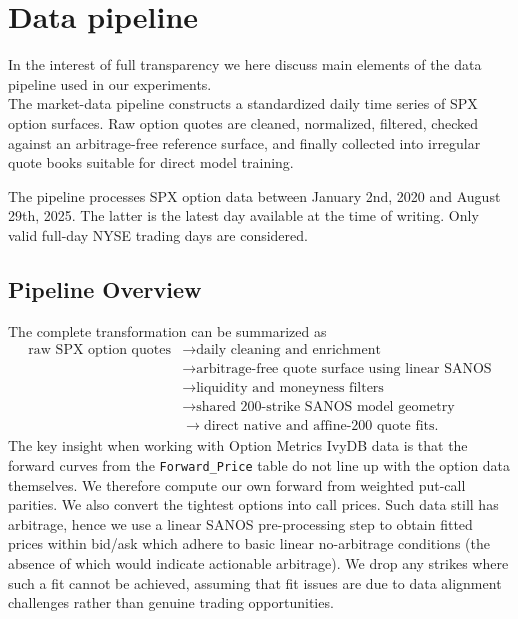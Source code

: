 \documentclass[11pt,a4paper]{article}
\begin{document}
\section{Data pipeline}\label{app:data-pipeline}

In the interest of full transparency we here discuss main elements of the data pipeline used
in our experiments. \\

The market-data pipeline constructs a standardized daily time series of SPX option surfaces. Raw option quotes are cleaned, normalized, filtered, checked against an arbitrage-free reference surface, and finally collected into irregular quote books suitable for direct model training.


The pipeline processes SPX option data between January 2nd, 2020 and August 29th, 2025. The latter
is the latest day available at the time of writing. Only valid full-day NYSE trading days are considered.

\subsection{Pipeline Overview}

The complete transformation can be summarized as
%
\[
\begin{aligned}
\text{raw SPX option quotes}
&\longrightarrow \text{daily cleaning and enrichment} \\
&\longrightarrow \text{arbitrage-free quote surface using linear SANOS} \\
&\longrightarrow \text{liquidity and moneyness filters} \\
&\longrightarrow \text{shared 200-strike SANOS model geometry} \\
&\longrightarrow \text{direct native and affine-200 quote fits}.
\end{aligned}
\]
The key insight when working with Option Metrics IvyDB data is that the forward curves
from the \texttt{Forward\_Price} table do not line up with the option data themselves. We therefore
compute our own forward from weighted put-call parities. We also convert the tightest options into call prices. Such data still has arbitrage, hence we use a linear SANOS pre-processing step to obtain fitted prices within bid/ask which adhere to basic linear no-arbitrage conditions (the absence of which would indicate actionable arbitrage). We drop any strikes where such a fit
cannot be achieved, assuming that fit issues are due to data alignment challenges rather than
genuine trading opportunities.
\end{document}

